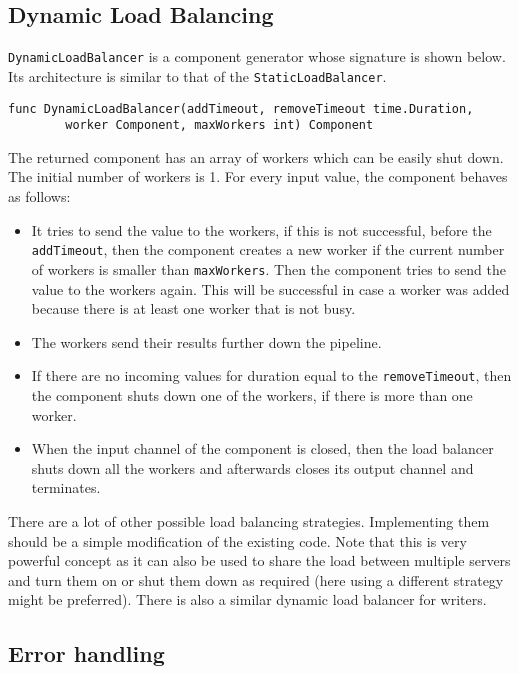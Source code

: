 \subsection{Dynamic Load Balancing}
\texttt{DynamicLoadBalancer} is a component generator whose signature is
shown below. Its architecture is similar
to that of the \texttt{StaticLoadBalancer}.
\begin{lstlisting}
func DynamicLoadBalancer(addTimeout, removeTimeout time.Duration, 
        worker Component, maxWorkers int) Component
\end{lstlisting}
The returned component has an array of workers which can be easily shut down.
The initial number of workers is 1. 
For every input value, the component behaves as follows:
\begin{itemize}
	\item It tries to send the value to the workers, if this is not successful, 
		  before the \texttt{addTimeout}, then the component creates a new worker
          if the current number of workers is smaller than \texttt{maxWorkers}.
          Then the component tries to send the value to the workers again. This will 
          be successful in case a worker was added because there is at least one 
          worker that is not busy.

	\item The workers send their results further down the pipeline.

	\item If there are no incoming values for duration equal to the 
          \texttt{removeTimeout}, then the component shuts down one 
          of the workers, if there is more than one worker.

	\item When the input channel of the component is closed, then the load balancer 
          shuts down all the workers and afterwards closes its output channel and
          terminates.
\end{itemize}
There are a lot of other possible load balancing strategies. 
Implementing them should be a simple modification of the existing code.
Note that this is very powerful concept as it can also be used to share
the load between multiple servers and turn them on or shut them down as
required (here using a different strategy might be preferred). There is
also a similar dynamic load balancer for writers.

\subsection{Error handling}

